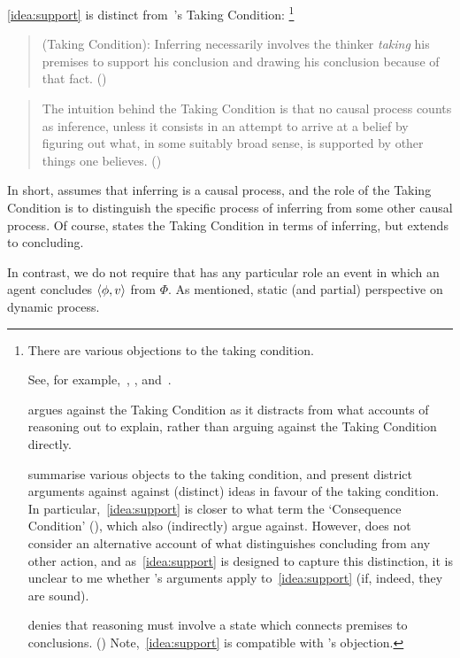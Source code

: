 \begin{note}
  \autoref{idea:support} is distinct from~\citeauthor{Boghossian:2014aa}'s Taking Condition:%
  \footnote{
    There are various objections to the taking condition.

    See, for example,~\textcite{Hlobil:2014tq}, \textcite{McHugh:2016vp}, and~\textcite{Wright:2014tt}.

    \citeauthor{Hlobil:2014tq} argues against the Taking Condition as it distracts from what accounts of reasoning out to explain, rather than arguing against the Taking Condition directly.

    \citeauthor{McHugh:2016vp} summarise various objects to the taking condition, and present district arguments against against (distinct) ideas in favour of the taking condition.
    In particular,~\autoref{idea:support} is closer to what \citeauthor{McHugh:2016vp} term the `Consequence Condition' (\citeyear[cf.][316]{McHugh:2016vp}), which \citeauthor{McHugh:2016vp} also (indirectly) argue against.
    However, \citeauthor{McHugh:2016vp} does not consider an alternative account of what distinguishes concluding from any other action, and as~\autoref{idea:support} is designed to capture this distinction, it is unclear to me whether \citeauthor{McHugh:2016vp}'s arguments apply to~\autoref{idea:support} (if, indeed, they are sound).

    \citeauthor{Wright:2014tt} denies that reasoning must involve a state which connects premises to conclusions. (\citeyear[Cf.][33-34]{Wright:2014tt})
    Note,~\autoref{idea:support} is compatible with \citeauthor{Wright:2014tt}'s objection.
  }

  \begin{quote}
    (Taking Condition):
    Inferring necessarily involves the thinker \emph{taking} his premises to support his conclusion and drawing his conclusion because of that fact.%
    \mbox{}\hfill\mbox{(\citeyear[5]{Boghossian:2014aa})}
  \end{quote}

  \begin{quote}
    The intuition behind the Taking Condition is that no causal process counts as inference, unless it consists in an attempt to arrive at a belief by figuring out what, in some suitably broad sense, is supported by other things one believes.%
    \mbox{}\hfill\mbox{(\citeyear[5]{Boghossian:2014aa})}
  \end{quote}

  In short, \citeauthor{Boghossian:2014aa} assumes that inferring is a causal process, and the role of the Taking Condition is to distinguish the specific process of inferring from some other causal process.
  Of course, \citeauthor{Boghossian:2014aa} states the Taking Condition in terms of inferring, but extends to concluding.

  In contrast, we do not require that \support{} has any particular role an event in which an agent concludes \(\langle \phi, v \rangle\) from \(\Phi\).
  As mentioned, static (and partial) perspective on dynamic process.
\end{note}

